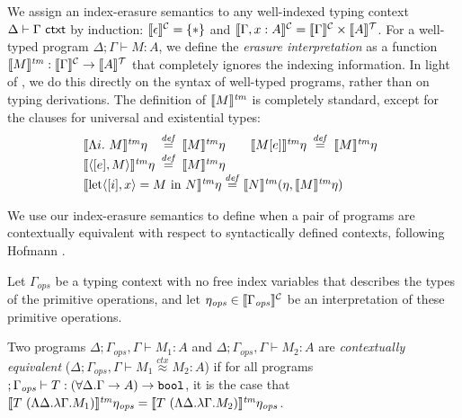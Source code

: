 We assign an index-erasure semantics to any well-indexed typing
context $\Delta \vdash \Gamma \textup{\textsf{ ctxt}}$ by induction:
$\llbracket \epsilon \rrbracket^{\mathcal{C}} = \{*\}$ and $\llbracket \Gamma, x : A \rrbracket^{\mathcal{C}} =
\llbracket \Gamma \rrbracket^{\mathcal{C}} \times \llbracket A \rrbracket^{\mathcal{T}}$. For a well-typed program $\Delta;
\Gamma \vdash M : A$, we define the \emph{erasure interpretation} as a
function $\llbracket M \rrbracket^{\mathit{tm}} : \llbracket \Gamma \rrbracket^{\mathcal{C}} \to \llbracket A \rrbracket^{\mathcal{T}}$ that completely
ignores the indexing information. In light of
, we do this %
directly on the syntax of well-typed programs, rather than on typing
derivations. The definition of $\llbracket M \rrbracket^{\mathit{tm}}$ is completely standard,
except for the clauses for universal and existential types:
\begin{displaymath}
  \begin{array}{@{}l}
    \begin{array}{@{}l@{\hspace{0.5em}}c@{\hspace{0.5em}}l@{\hspace{2em}}l@{\hspace{0.5em}}c@{\hspace{0.5em}}l@{}}
      \tmSem{\Lambda i.\ M}\eta & \isDefinedAs & \tmSem{M}\eta
      &
      \tmSem{M[e]}\eta & \isDefinedAs & \tmSem{M}\eta \\
      \tmSem{\langle [e], M\rangle}\eta & \isDefinedAs & \tmSem{M}\eta
    \end{array} \\
    \tmSem{\mathrm{let}\langle[i], x\rangle = M\ \mathrm{in}\ N}\eta \isDefinedAs \tmSem{N}(\eta, \tmSem{M}\eta)
  \end{array}
\end{displaymath}

We use our index-erasure semantics to define when a pair of programs
are contextually equivalent with respect to syntactically defined
contexts, following Hofmann \cite{hofmann08correctness}.

\begin{definition}\label{defn:ctxt-equiv}
  Let $\Gamma_{\mathit{ops}}$ be a typing context with no free index
  variables that describes the types of the primitive operations, and
  let $\eta_{\mathit{ops}} \in \llbracket \Gamma_{\mathit{ops}} \rrbracket^{\mathcal{C}}$ be an interpretation
  of these primitive operations.

  Two programs $\Delta; \Gamma_{\mathit{ops}}, \Gamma \vdash M_1 : A$
  and $\Delta; \Gamma_{\mathit{ops}}, \Gamma \vdash M_2 : A$ are
  \emph{contextually equivalent} ($\Delta; \Gamma_{\mathit{ops}},
  \Gamma \vdash M_1 \stackrel{ctx}\approx M_2 : A$) if for all
  programs $;\Gamma_{\mathit{ops}} \vdash T : (\forall \Delta. \Gamma
  \to A) \to \textup{\texttt{bool}}$, it is the case that $\llbracket T\ (\Lambda
    \Delta. \lambda \Gamma. M_1) \rrbracket^{\mathit{tm}}\eta_{\mathit{ops}} = \llbracket T\
    (\Lambda \Delta. \lambda \Gamma. M_2) \rrbracket^{\mathit{tm}}\eta_{\mathit{ops}}$.
\end{definition}

